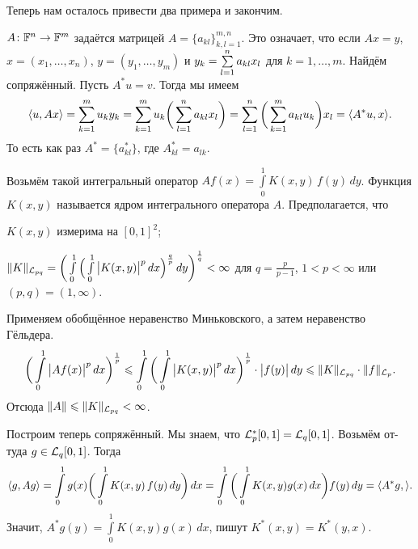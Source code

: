 Теперь нам осталось привести два примера и закончим.
\begin{Exa}
  $A\colon \mathbb F^n\rightarrow\mathbb F^m$ задаётся матрицей $A = \{a_{kl}\}_{k,l=1}^{m,n}$. Это означает, что если $Ax=y$, $x = (x_1,\dots,x_n)$, $y = (y_1,\dots,y_m)$ и $y_k = \sum\limits_{l = 1}^{n} a_{kl}x_l$ для $k=1,\dots,m$. Найдём сопряжённый. Пусть $A^*u=v$. Тогда мы имеем
\[
  \langle u,Ax\rangle = \sum\limits_{k = 1}^{m} u_ky_k=\sum\limits_{k = 1}^{m} u_k\bigg(\sum\limits_{l = 1}^{n} a_{kl}x_l\bigg) = 
  \sum\limits_{l = 1}^{n}\bigg(\sum\limits_{k = 1}^{m} a_{kl} u_k\bigg)x_l = \langle A^*u,x\rangle.
\]
То есть как раз $A^* = \{a_{kl}^*\}$, где $A^*_{kl} = a_{lk}$.
\end{Exa}
\begin{Exa}
  Возьмём такой интегральный оператор $Af(x) = \int\limits_0^1K(x,y)\,f(y)\,dy$. Функция $K(x,y)$ называется ядром интегрального оператора $A$. Предполагается, что
\begin{roItems}
\item $K(x,y)$ измерима на $[0,1]^2$;
\item $\|K\|_{\mathcal L_{pq}} = \bigg(\int\limits_0^1\Big(\int\limits_0^1\big|K(x,y)\big|^p\,dx\Big)^{\frac qp}\,dy\bigg)^{\frac 1q}<\infty$ для $q = \frac p{p-1}$, $1<p<\infty$ или $(p,q) = (1,\infty)$.
\end{roItems}
\end{Exa}
\begin{Proof}
  Применяем обобщённое неравенство Миньковского, а затем неравенство Гёльдера.
\[
  \bigg(\int\limits_0^1\big|A f(x)\big|^p\,dx\bigg)^{\frac 1p}\leqslant 
  \int\limits_0^1\bigg(\int\limits_0^1\big|K(x,y)\big|^p\,dx\bigg)^{\frac1p}\cdot \big|f(y)\big|\,dy\leqslant \|K\|_{\mathcal L_{pq}}\cdot \|f\|_{\mathcal L_p}.
\]
Отсюда $\|A\|\leqslant \|K\|_{\mathcal L_{pq}}<\infty$.

Построим теперь сопряжённый. Мы знаем, что $\mathcal L_p^*[0,1] = \mathcal L_q[0,1]$. Возьмём от-туда $g\in\mathcal L_q[0,1]$. Тогда 
\[
  \langle g,Ag\rangle = \int\limits_0^1 g(x)\bigg( \int\limits_0^1 K(x,y)\,f(y)\,dy\bigg)\,dx = 
  \int\limits_0^1\bigg(\int\limits_0^1 K(x,y)g(x)\,dx\bigg)f(y)\,dy = \langle A^*g,\rangle.
\]
Значит, $A^*g(y) = \int\limits_0^1 K(x,y) g(x)\,dx$, пишут $K^*(x,y)  = K^*(y,x)$.
\end{Proof}

